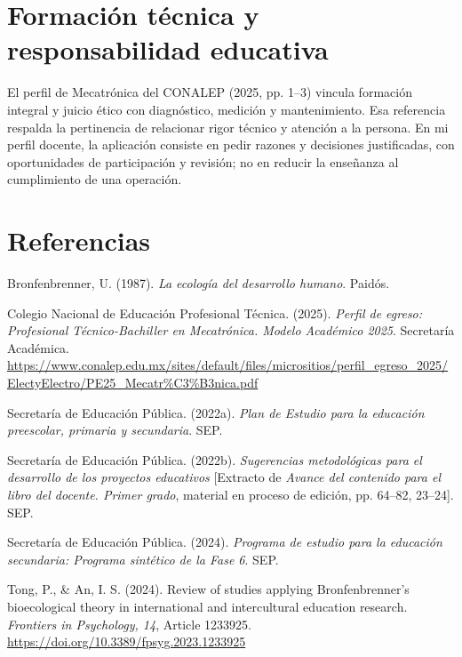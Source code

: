 \documentclass[spanish,letterpaper,oneside]{article}
\begin{document}
\section{Formación técnica y responsabilidad educativa}
El perfil de Mecatrónica del CONALEP (2025, pp. 1--3) vincula formación integral y juicio ético con diagnóstico, medición y mantenimiento. Esa referencia respalda la pertinencia de relacionar rigor técnico y atención a la persona. En mi perfil docente, la aplicación consiste en pedir razones y decisiones justificadas, con oportunidades de participación y revisión; no en reducir la enseñanza al cumplimiento de una operación.
\section*{Referencias}
{\setlength{\parskip}{6pt}
\par\hangindent=1.27cm  Bronfenbrenner, U. (1987). \textit{La ecología del desarrollo humano}. Paidós.
\par\hangindent=1.27cm Colegio Nacional de Educación Profesional Técnica. (2025). \textit{Perfil de egreso: Profesional Técnico-Bachiller en Mecatrónica. Modelo Académico 2025}. Secretaría Académica. \url{https://www.conalep.edu.mx/sites/default/files/micrositios/perfil_egreso_2025/ElectyElectro/PE25_Mecatr%C3%B3nica.pdf}
\par\hangindent=1.27cm  Secretaría de Educación Pública. (2022a). \textit{Plan de Estudio para la educación preescolar, primaria y secundaria}. SEP.
\par\hangindent=1.27cm  Secretaría de Educación Pública. (2022b). \textit{Sugerencias metodológicas para el desarrollo de los proyectos educativos} [Extracto de \textit{Avance del contenido para el libro del docente. Primer grado}, material en proceso de edición, pp. 64--82, 23--24]. SEP.
\par\hangindent=1.27cm  Secretaría de Educación Pública. (2024). \textit{Programa de estudio para la educación secundaria: Programa sintético de la Fase 6}. SEP.
\par\hangindent=1.27cm  Tong, P., \& An, I. S. (2024). Review of studies applying Bronfenbrenner’s bioecological theory in international and intercultural education research. \textit{Frontiers in Psychology, 14}, Article 1233925. \url{https://doi.org/10.3389/fpsyg.2023.1233925}
}
\end{document}

